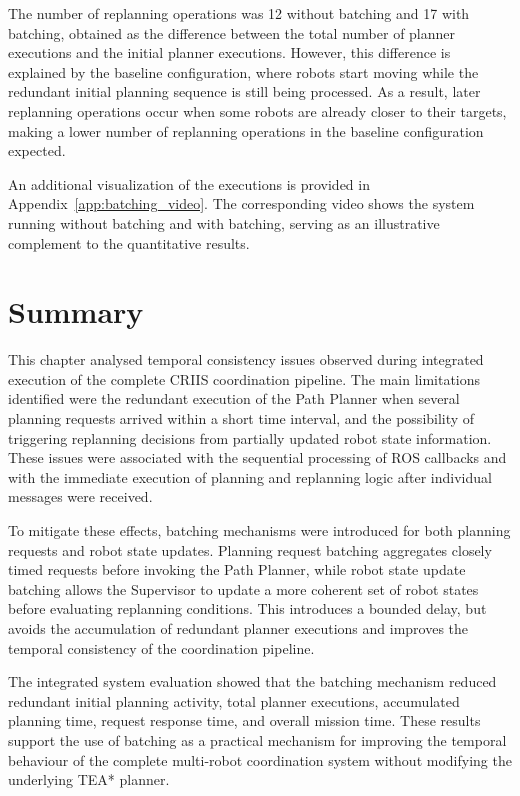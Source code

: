 The number of replanning operations was 12 without batching and 17 with batching, obtained as the
difference between the total number of planner executions and the initial planner executions.
However, this difference is explained by the baseline configuration, where robots start moving
while the redundant initial planning sequence is still being processed. As a result, later replanning
operations occur when some robots are already closer to their targets, making a lower number of
replanning operations in the baseline configuration expected.


An additional visualization of the executions is provided in Appendix~\ref{app:batching_video}. The
corresponding video shows the system running without batching and with batching, serving as an
illustrative complement to the quantitative results.


\section{Summary}
\label{sec:temporal_consistency_batching_summary}
\hspace{\parindent}
This chapter analysed temporal consistency issues observed during integrated execution of the
complete CRIIS coordination pipeline. The main limitations identified were the redundant execution
of the Path Planner when several planning requests arrived within a short time interval, and the
possibility of triggering replanning decisions from partially updated robot state information. These
issues were associated with the sequential processing of ROS callbacks and with the immediate
execution of planning and replanning logic after individual messages were received.

To mitigate these effects, batching mechanisms were introduced for both planning requests and
robot state updates. Planning request batching aggregates closely timed requests before invoking
the Path Planner, while robot state update batching allows the Supervisor to update a more coherent
set of robot states before evaluating replanning conditions. This introduces a bounded delay, but
avoids the accumulation of redundant planner executions and improves the temporal consistency of
the coordination pipeline.

The integrated system evaluation showed that the batching mechanism reduced redundant initial
planning activity, total planner executions, accumulated planning time, request response time, and
overall mission time. These results support the use of batching as a practical mechanism for
improving the temporal behaviour of the complete multi-robot coordination system without
modifying the underlying TEA* planner.